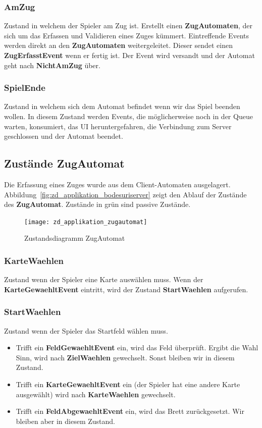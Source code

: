 \documentclass[12pt,halfparskip]{scrartcl}
\begin{document}
\subsubsection{AmZug}
\label{ssub:amzug}
Zustand in welchem der Spieler am Zug ist. Erstellt einen \textbf{ZugAutomaten}, der sich um das Erfassen und Validieren eines Zuges kümmert. Eintreffende Events werden direkt an den \textbf{ZugAutomaten} weitergeleitet. Dieser sendet einen \textbf{ZugErfasstEvent} wenn er fertig ist. Der Event wird versandt und der Automat geht nach \textbf{NichtAmZug} über.

\subsubsection{SpielEnde}
Zustand in welchem sich dem Automat befindet wenn wir das Spiel beenden wollen. In diesem Zustand werden Events, die möglicherweise noch in der Queue warten, konsumiert, das UI heruntergefahren, die Verbindung zum Server geschlossen und der Automat beendet.

\subsection{Zustände ZugAutomat}
\label{sub:zustände_zugautomat}
Die Erfassung eines Zuges wurde aus dem Client-Automaten ausgelagert. Abbildung~\vref{fig:zd_applikation_bodesuriserver} zeigt den Ablauf der Zustände des \textbf{ZugAutomat}. Zustände in grün sind passive Zustände.
\begin{figure}[h]
	\centering
	\texttt{[image: zd\_applikation\_zugautomat]}
	\caption{Zustandsdiagramm ZugAutomat}
	\label{fig:zd_applikation_zugautomat}
\end{figure}

\subsubsection{KarteWaehlen}
\label{ssub:kartewaehlen}
Zustand wenn der Spieler eine Karte auswählen muss. Wenn der \textbf{KarteGewaehltEvent} eintritt, wird der Zustand \textbf{StartWaehlen} aufgerufen.

\subsubsection{StartWaehlen}
\label{ssub:startwaehlen}
Zustand wenn der Spieler das Startfeld wählen muss.
\begin{itemize}
	\item Trifft ein \textbf{FeldGewaehltEvent} ein, wird das Feld überprüft. Ergibt die Wahl Sinn, wird nach \textbf{ZielWaehlen} gewechselt. Sonst bleiben wir in diesem Zustand.
	\item Trifft ein \textbf{KarteGewaehltEvent} ein (der Spieler hat eine andere Karte ausgewählt) wird nach \textbf{KarteWaehlen} gewechselt.
	\item Trifft ein \textbf{FeldAbgewaehltEvent} ein, wird das Brett zurückgesetzt. Wir bleiben aber in diesem Zustand.
\end{itemize}
\end{document}
